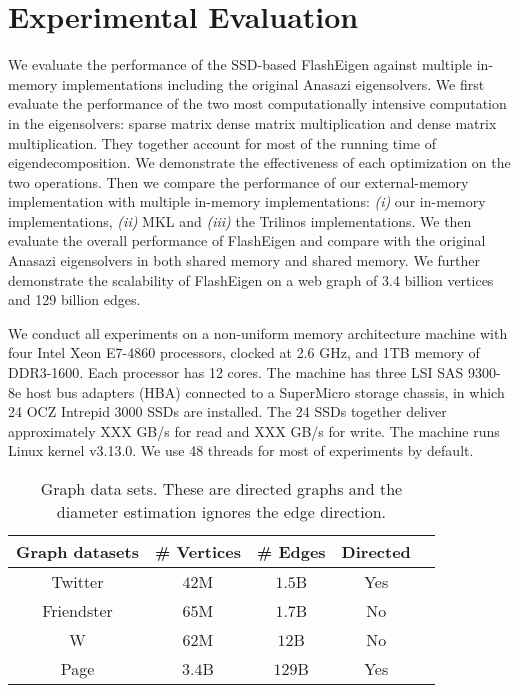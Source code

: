 \section{Experimental Evaluation}

We evaluate the performance of the SSD-based FlashEigen against multiple
in-memory implementations including the original Anasazi eigensolvers.
We first evaluate the performance
of the two most computationally intensive computation in the eigensolvers:
sparse matrix dense matrix multiplication and dense matrix multiplication.
They together account for most of the running time of eigendecomposition.
We demonstrate the effectiveness of each optimization on the two operations.
Then we compare the performance of our external-memory implementation with
multiple in-memory implementations: \textit{(i)} our in-memory implementations,
\textit{(ii)} MKL and \textit{(iii)} the Trilinos implementations. We then
evaluate the overall
performance of FlashEigen and compare with the original Anasazi eigensolvers
in both shared memory and shared memory. We further demonstrate the scalability
of FlashEigen on a web graph of 3.4 billion vertices and 129 billion edges.

We conduct all experiments on a non-uniform memory architecture machine with
four Intel Xeon E7-4860 processors, clocked at 2.6 GHz, and 1TB memory of
DDR3-1600. Each processor has 12 cores. The machine has three LSI SAS 9300-8e
host bus adapters (HBA) connected to a SuperMicro storage chassis, in which
24 OCZ Intrepid 3000 SSDs are installed. The 24 SSDs together deliver
approximately XXX GB/s for read and XXX GB/s for write. The machine runs
Linux kernel v3.13.0. We use 48 threads for most of experiments by default.

\begin{table}
\begin{center}
\footnotesize
\begin{tabular}{|c|c|c|c|c|}
\hline
Graph datasets & \# Vertices & \# Edges & Directed \\
\hline
Twitter \cite{twitter} & $42$M & $1.5$B & Yes \\
\hline
Friendster \cite{} & $65$M & $1.7$B & No \\
\hline
W \cite{} & $62$M & $12$B & No \\
\hline
Page \cite{web_graph} & $3.4$B & $129$B & Yes \\
\hline
\end{tabular}
\normalsize
\end{center}
\vspace{-10pt}
\caption{Graph data sets. These are directed graphs and the diameter
estimation ignores the edge direction.}
\label{graphs}
\end{table}

